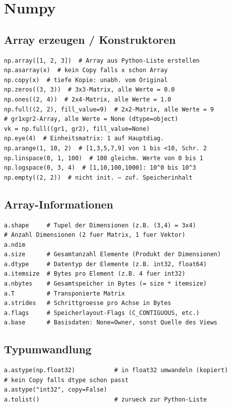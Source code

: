\section{Numpy}\label{sec:06-numpy}


\subsection{Array erzeugen / Konstruktoren}\label{sec:06-array-erzeugen}
\begin{codebox}
\begin{lstlisting}[style=CodeExpert]
np.array([1, 2, 3])  # Array aus Python-Liste erstellen
np.asarray(x)  # kein Copy falls x schon Array
np.copy(x)  # tiefe Kopie: unabh. vom Original
np.zeros((3, 3))  # 3x3-Matrix, alle Werte = 0.0
np.ones((2, 4))  # 2x4-Matrix, alle Werte = 1.0
np.full((2, 2), fill_value=9)  # 2x2-Matrix, alle Werte = 9
# gr1xgr2-Array, alle Werte = None (dtype=object)
vk = np.full((gr1, gr2), fill_value=None)
np.eye(4)  # Einheitsmatrix: 1 auf Hauptdiag.
np.arange(1, 10, 2)  # [1,3,5,7,9] von 1 bis <10, Schr. 2
np.linspace(0, 1, 100)  # 100 gleichm. Werte von 0 bis 1
np.logspace(0, 3, 4)  # [1,10,100,1000]: 10^0 bis 10^3
np.empty((2, 2))  # nicht init. – zuf. Speicherinhalt
\end{lstlisting}
\end{codebox}


\subsection{Array-Informationen}\label{sec:06-array-informationen}
\begin{codebox}
\begin{lstlisting}[style=CodeExpert]
a.shape     # Tupel der Dimensionen (z.B. (3,4) = 3x4)
# Anzahl Dimensionen (2 fuer Matrix, 1 fuer Vektor)
a.ndim
a.size      # Gesamtanzahl Elemente (Produkt der Dimensionen)
a.dtype     # Datentyp der Elemente (z.B. int32, float64)
a.itemsize  # Bytes pro Element (z.B. 4 fuer int32)
a.nbytes    # Gesamtspeicher in Bytes (= size * itemsize)
a.T         # Transponierte Matrix
a.strides   # Schrittgroesse pro Achse in Bytes
a.flags     # Speicherlayout-Flags (C_CONTIGUOUS, etc.)
a.base      # Basisdaten: None=Owner, sonst Quelle des Views
\end{lstlisting}
\end{codebox}


\subsection{Typumwandlung}\label{sec:06-typumwandlung}
\begin{codebox}
\begin{lstlisting}[style=CodeExpert]
a.astype(np.float32)           # in float32 umwandeln (kopiert)
# kein Copy falls dtype schon passt
a.astype("int32", copy=False)
a.tolist()                     # zurueck zur Python-Liste
\end{lstlisting}
\end{codebox}

